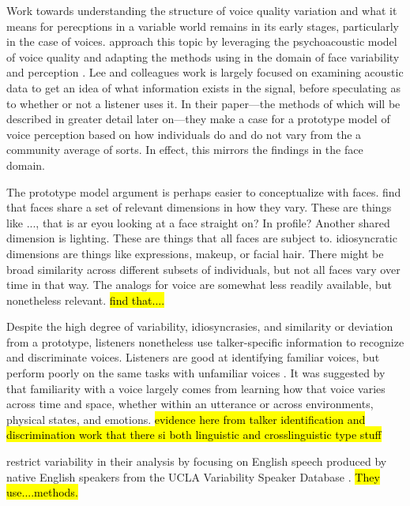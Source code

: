 Work towards understanding the structure of voice quality variation and what it means for perecptions in a variable world remains in its early stages, particularly in the case of voices. \citet{lee_2019_acoustic} approach this topic by leveraging the psychoacoustic model of voice quality and adapting the methods using in the domain of face variability and perception \citep{burton_2016_faces}. Lee and colleagues work is largely focused on examining acoustic data to get an idea of what information exists in the signal, before speculating as to whether or not a listener uses it. In their paper---the methods of which will be described in greater detail later on---they make a case for a prototype model of voice perception based on how individuals do and do not vary from the a community average of sorts. In effect, this mirrors the findings in the face domain. 

The prototype model argument is perhaps easier to conceptualize with faces. \citet{burton_2016_faces} find that faces share a set of relevant dimensions in how they vary. These are things like ..., that is ar eyou looking at a face straight on? In profile? Another shared dimension is lighting. These are things that all faces are subject to. idiosyncratic dimensions are things like expressions, makeup, or facial hair. There might be broad similarity across different subsets of individuals, but not all faces vary over time in that way. The analogs for voice are somewhat less readily available, but nonetheless relevant. \citet{lee_2019_acoustic}\hl{ find that....}

Despite the high degree of variability, idiosyncrasies, and similarity or deviation from a prototype, listeners nonetheless use talker-specific information to recognize and discriminate voices. Listeners are good at identifying familiar voices, but perform poorly on the same tasks with unfamiliar voices \citep{nygaard_1998_talker}. It was suggested by \citet{lee_2019_acoustic} that familiarity with a voice largely comes from learning how that voice varies across time and space, whether within an utterance or across environments, physical states, and emotions.
\hl{evidence here from talker identification and discrimination work that there si both linguistic and crosslinguistic type stuff}

\citet{lee_2019_acoustic} restrict variability in their analysis by focusing on English speech produced by native English speakers from the UCLA Variability Speaker Database \citep{keating_2019_database}. \hl{They use....methods.}

